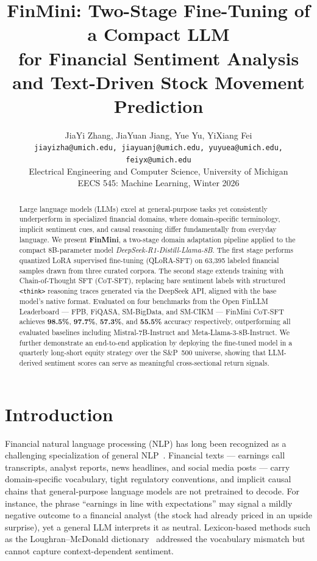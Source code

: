 \documentclass[11pt,letterpaper]{article}
\title{\textbf{FinMini: Two-Stage Fine-Tuning of a Compact LLM\\
for Financial Sentiment Analysis and Text-Driven Stock Movement Prediction}}
\author{
  JiaYi Zhang,\; JiaYuan Jiang,\; Yue Yu,\; YiXiang Fei \\[2pt]
  \small\texttt{jiayizha@umich.edu,\; jiayuanj@umich.edu,\;
                yuyuea@umich.edu,\; feiyx@umich.edu} \\[2pt]
  \small Electrical Engineering and Computer Science, University of Michigan \\
  \small EECS 545: Machine Learning, Winter 2026
}
\date{}
\begin{document}
\maketitle
\thispagestyle{empty}

\begin{abstract}
Large language models (LLMs) excel at general-purpose tasks yet
consistently underperform in specialized financial domains, where
domain-specific terminology, implicit sentiment cues, and causal
reasoning differ fundamentally from everyday language.
We present \textbf{FinMini}, a two-stage domain adaptation pipeline
applied to the compact 8B-parameter model
\textit{DeepSeek-R1-Distill-Llama-8B}.
The first stage performs quantized LoRA supervised fine-tuning (QLoRA-SFT)
on 63,395 labeled financial samples drawn from three curated corpora.
The second stage extends training with Chain-of-Thought SFT (CoT-SFT),
replacing bare sentiment labels with structured \texttt{<think>} reasoning
traces generated via the DeepSeek API, aligned with the base model's
native format.
Evaluated on four benchmarks from the Open FinLLM Leaderboard ---
FPB, FiQASA, SM-BigData, and SM-CIKM --- FinMini CoT-SFT achieves
\textbf{98.5\%}, \textbf{97.7\%}, \textbf{57.3\%}, and \textbf{55.5\%}
accuracy respectively, outperforming all evaluated baselines including
Mistral-7B-Instruct and Meta-Llama-3-8B-Instruct.
We further demonstrate an end-to-end application by deploying the
fine-tuned model in a quarterly long-short equity strategy over the
S\&P~500 universe, showing that LLM-derived sentiment scores can serve
as meaningful cross-sectional return signals.
\end{abstract}

\section{Introduction}
\label{sec:intro}

Financial natural language processing (NLP) has long been recognized as
a challenging specialization of general NLP~\cite{du2024survey}.
Financial texts --- earnings call transcripts, analyst reports, news
headlines, and social media posts --- carry domain-specific vocabulary,
tight regulatory conventions, and implicit causal chains that
general-purpose language models are not pretrained to decode.
For instance, the phrase ``earnings in line with expectations'' may signal
a mildly negative outcome to a financial analyst (the stock had already
priced in an upside surprise), yet a general LLM interprets it as neutral.
Lexicon-based methods such as the Loughran--McDonald
dictionary~\cite{loughran2011liability} addressed the vocabulary mismatch
but cannot capture context-dependent sentiment.
\end{document}
